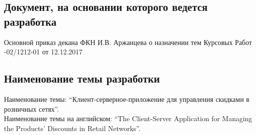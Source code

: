 \subsection{Документ, на основании которого ведется разработка}
Основной приказ декана ФКН И.В. Аржанцева о назначении тем Курсовых Работ
-02/1212-01 от 12.12.2017


\subsection{Наименование темы разработки}
Наименование темы: ``Клиент-серверное-приложение для управления скидками в розничных сетях''. \\
Наименование темы на английском: ``The Client-Server Application for Managing the Products' Discounts in Retail Networks''. \\
